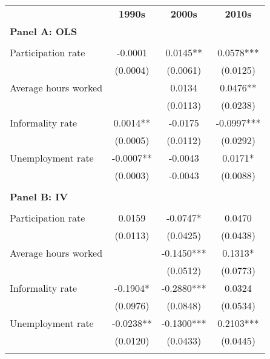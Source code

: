 \begin{tabular}{rccc}
\toprule
      & \multirow{2}[2]{*}{\textbf{1990s}} & \multirow{2}[2]{*}{\textbf{2000s}} & \multirow{2}[2]{*}{\textbf{2010s}} \\
      &       &       &  \\
\cmidrule{2-4}\multicolumn{1}{l}{\textbf{Panel A: OLS}} &       &       &  \\
      &       &       &  \\
\multicolumn{1}{l}{Participation rate} & -0.0001 & 0.0145** & 0.0578*** \\
      & (0.0004) & (0.0061) & (0.0125) \\
\multicolumn{1}{l}{Average hours worked} &       & 0.0134 & 0.0476** \\
      &       & (0.0113) & (0.0238) \\
\multicolumn{1}{l}{Informality rate} & 0.0014** & -0.0175 & -0.0997*** \\
      & (0.0005) & (0.0112) & (0.0292) \\
\multicolumn{1}{l}{Unemployment rate} & -0.0007** & -0.0043 & 0.0171* \\
      & (0.0003) & -0.0043 & (0.0088) \\
      &       &       &  \\
\multicolumn{1}{l}{\textbf{Panel B: IV}} &       &       &  \\
      &       &       &  \\
\multicolumn{1}{l}{Participation rate} & 0.0159 & -0.0747* & 0.0470 \\
      & (0.0113) & (0.0425) & (0.0438) \\
\multicolumn{1}{l}{Average hours worked} &       & -0.1450*** & 0.1313* \\
      &       & (0.0512) & (0.0773) \\
\multicolumn{1}{l}{Informality rate} & -0.1904* & -0.2880*** & 0.0324 \\
      & (0.0976) & (0.0848) & (0.0534) \\
\multicolumn{1}{l}{Unemployment rate} & -0.0238** & -0.1300*** & 0.2103*** \\
      & (0.0120) & (0.0433) & (0.0445) \\
      &       &       &  \\
\bottomrule
\end{tabular}%
